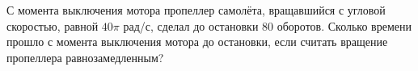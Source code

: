 С момента выключения мотора пропеллер самолёта, вращавшийся с угловой
скоростью, равной $40\pi$ рад/с, сделал до остановки $80$ оборотов.
Сколько времени прошло с момента выключения мотора до остановки, если
считать вращение пропеллера равнозамедленным?
